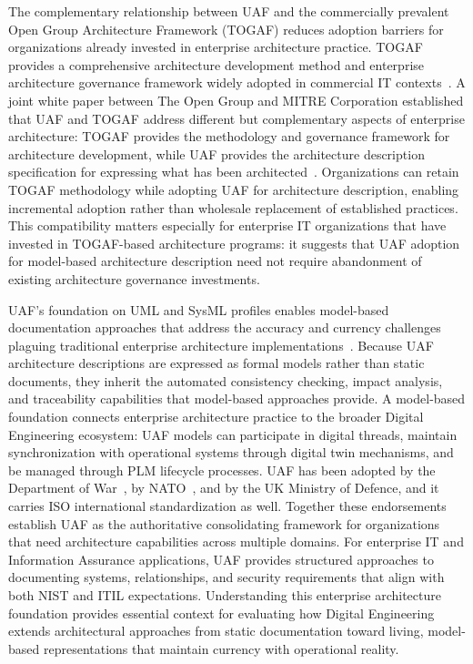 The complementary relationship between UAF and the commercially prevalent Open Group Architecture Framework (TOGAF) reduces adoption barriers for organizations already invested in enterprise architecture practice. TOGAF provides a comprehensive architecture development method and enterprise architecture governance framework widely adopted in commercial IT contexts~\parencite{TOGAF_2018}. A joint white paper between The Open Group and MITRE Corporation established that UAF and TOGAF address different but complementary aspects of enterprise architecture: TOGAF provides the methodology and governance framework for architecture development, while UAF provides the architecture description specification for expressing what has been architected~\parencite{OpenGroup_MITRE_2013}. Organizations can retain TOGAF methodology while adopting UAF for architecture description, enabling incremental adoption rather than wholesale replacement of established practices. This compatibility matters especially for enterprise IT organizations that have invested in TOGAF-based architecture programs: it suggests that UAF adoption for model-based architecture description need not require abandonment of existing architecture governance investments.

UAF's foundation on UML and SysML profiles enables model-based documentation approaches that address the accuracy and currency challenges plaguing traditional enterprise architecture implementations~\parencite{Aerospace_UAF_2023}. Because UAF architecture descriptions are expressed as formal models rather than static documents, they inherit the automated consistency checking, impact analysis, and traceability capabilities that model-based approaches provide. A model-based foundation connects enterprise architecture practice to the broader Digital Engineering ecosystem: UAF models can participate in digital threads, maintain synchronization with operational systems through digital twin mechanisms, and be managed through PLM lifecycle processes. UAF has been adopted by the Department of War~\parencite{DoD_Engineering_2022}, by NATO~\parencite{NATO_NAF_2018}, and by the UK Ministry of Defence, and it carries ISO international standardization as well. Together these endorsements establish UAF as the authoritative consolidating framework for organizations that need architecture capabilities across multiple domains. For enterprise IT and Information Assurance applications, UAF provides structured approaches to documenting systems, relationships, and security requirements that align with both NIST and ITIL expectations. Understanding this enterprise architecture foundation provides essential context for evaluating how Digital Engineering extends architectural approaches from static documentation toward living, model-based representations that maintain currency with operational reality.

